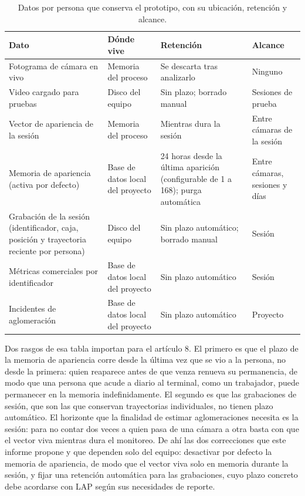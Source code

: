 \begin{table}[H]
\centering
\small
\caption{Datos por persona que conserva el prototipo, con su ubicación, retención y alcance.}
\label{tab:retencion}
\begin{tabular}{@{}L{3.3cm}L{3.1cm}L{4.1cm}L{3.4cm}@{}}
\toprule
\textbf{Dato} & \textbf{Dónde vive} & \textbf{Retención} & \textbf{Alcance} \\
\midrule
Fotograma de cámara en vivo & Memoria del proceso & Se descarta tras analizarlo & Ninguno \\
Video cargado para pruebas & Disco del equipo & Sin plazo; borrado manual & Sesiones de prueba \\
Vector de apariencia de la sesión & Memoria del proceso & Mientras dura la sesión & Entre cámaras de la sesión \\
Memoria de apariencia (activa por defecto) & Base de datos local del proyecto & 24 horas desde la última aparición (configurable de 1 a 168); purga automática & Entre cámaras, sesiones y días \\
Grabación de la sesión (identificador, caja, posición y trayectoria reciente por persona) & Disco del equipo & Sin plazo automático; borrado manual & Sesión \\
Métricas comerciales por identificador & Base de datos local del proyecto & Sin plazo automático & Sesión \\
Incidentes de aglomeración & Base de datos local del proyecto & Sin plazo automático & Proyecto \\
\bottomrule
\end{tabular}
\end{table}

Dos rasgos de esa tabla importan para el artículo 8. El primero es que el plazo
de la memoria de apariencia corre desde la última vez que se vio a la persona,
no desde la primera: quien reaparece antes de que venza renueva su permanencia,
de modo que una persona que acude a diario al terminal, como un trabajador,
puede permanecer en la memoria indefinidamente. El segundo es que las
grabaciones de sesión, que son las que conservan trayectorias individuales,
no tienen plazo automático. El horizonte que la finalidad de estimar
aglomeraciones necesita es la sesión: para no contar dos veces a quien pasa de
una cámara a otra basta con que el vector viva mientras dura el monitoreo. De
ahí las dos correcciones que este informe propone y que dependen solo del
equipo: desactivar por defecto la memoria de apariencia, de modo que el vector
viva solo en memoria durante la sesión, y fijar una retención automática para
las grabaciones, cuyo plazo concreto debe acordarse con LAP según sus
necesidades de reporte.

